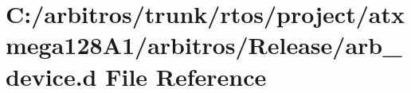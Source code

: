 \hypertarget{rtos_2project_2atxmega128_a1_2arbitros_2_release_2arb__device_8d}{\section{C\-:/arbitros/trunk/rtos/project/atxmega128\-A1/arbitros/\-Release/arb\-\_\-device.d File Reference}
\label{rtos_2project_2atxmega128_a1_2arbitros_2_release_2arb__device_8d}
}
